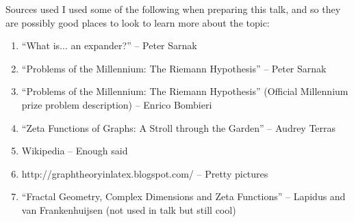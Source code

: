 \documentclass{beamer}
\begin{document}
\begin{frame}{Sources used}
I used some of the following when preparing this talk, and so they are possibly good places to look to learn more about the topic:
\begin{enumerate}
\item ``What is... an expander?'' -- Peter Sarnak
\item ``Problems of the Millennium: The Riemann Hypothesis'' -- Peter Sarnak
\item ``Problems of the Millennium: The Riemann Hypothesis'' (Official Millennium prize problem description) -- Enrico Bombieri
\item ``Zeta Functions of Graphs: A Stroll through the Garden'' -- Audrey Terras
\item Wikipedia -- Enough said
\item http://graphtheoryinlatex.blogspot.com/ -- Pretty pictures
\item ``Fractal Geometry, Complex Dimensions and Zeta Functions'' -- Lapidus and van Frankenhuijsen (not used in talk but still cool)
\end{enumerate}
\end{frame}
\end{document}
